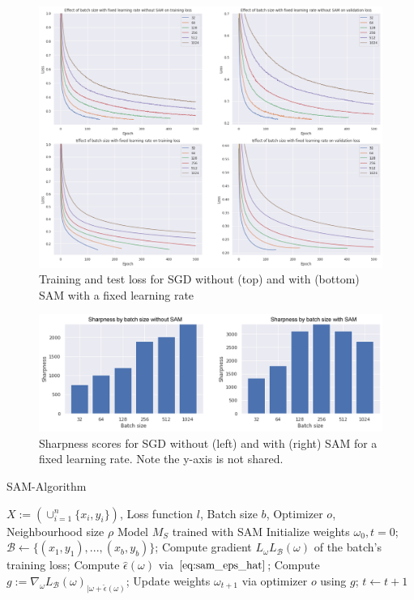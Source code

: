 \documentclass[10pt,conference,compsocconf]{IEEEtran}
\begin{document}
\begin{figure}[H]
  \centering
  \includegraphics[width=\columnwidth]{img/figure6_val_loss_with_without_sam_sgd_FIXED_LR}
  \caption{Training and test loss for SGD without (top) and with (bottom) SAM with a fixed learning rate}
  \vspace{-3mm}
  \label{fig:adam-val-loss-with-without-fixed}
\end{figure}
\begin{figure}[H]
  \centering
  \includegraphics[width=\columnwidth]{img/figure7_sharpness_with_without_sam_sgd_FIXED_LR}
  \caption{Sharpness scores for SGD without (left) and with (right) SAM for a fixed learning rate. Note the y-axis is not shared.}
  \vspace{-3mm}
  \label{fig:adam-sharpness-with-without-fixed}
\end{figure}

\clearpage

\begin{algorithm}
\caption{SAM-Algorithm}\label{alg:sam}
\begin{algorithmic}
\Require $X := (\cup_{i = 1}^n\{x_i, y_i\})$, Loss function $l$, Batch size $b$, Optimizer $o$, Neighbourhood size $\rho$
\Ensure Model $M_S$ trained with SAM
\State Initialize weights $\omega_0, t = 0$;
	\State $\mathcal{B} \gets \{(x_1, y_1), ..., (x_b, y_b)\}$;	
	\State Compute gradient $L_\omega L_\mathcal{B}(\omega)$ of the batch's training loss; 
	\State Compute $\hat{\epsilon}(\omega)$ via $\eqref{eq:sam_eps_hat}$; 
	\State Compute $g := \nabla_\omega L_\mathcal{B}(\omega)_{|\omega + \hat{\epsilon}(\omega)}$; 
	\State Update weights $\omega_{t+1}$ via optimizer $o$ using $g$;
	\State $t \gets t+1$
\EndWhile
\end{algorithmic}
\end{algorithm}
\end{document}
